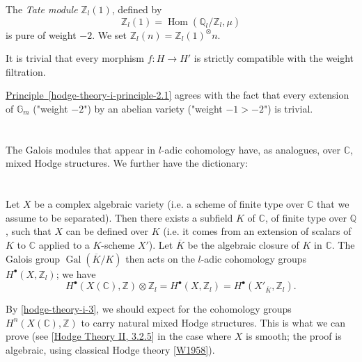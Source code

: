  The \emph{Tate module} \(\mathbb {Z}_l(1)\), defined by
  \[     \mathbb {Z}_l(1)     = \operatorname {Hom}(\mathbb {Q}_l/\mathbb {Z}_l,\mu )   \]
  is pure of weight \(-2\).
  We set \(\mathbb {Z}_l(n)=\mathbb {Z}_l(1)^\otimes  n\).\par{}It is trivial that every morphism \(f\colon  H\to  H'\) is strictly compatible with the weight filtration.\par{}\hyperref[hodge-theory-i-principle-2.1]{Principle~\ref*{hodge-theory-i-principle-2.1}} agrees with the fact that every extension of \(\mathbb {G}_m\) ("weight \(-2\)") by an abelian variety ("weight \(-1>-2\)") is trivial.\chapter{}\thispagestyle{fancy}\label{hodge-theory-i-3}\begin{translation}{}\label{hodge-theory-i-3-translation}\skipsinglepar\par{}The Galois modules that appear in \(l\)-adic cohomology have, as analogues, over \(\mathbb {C}\), mixed Hodge structures.
    We further have the dictionary:\end{translation}\chapter{}\thispagestyle{fancy}\label{hodge-theory-i-4}\par{}Let \(X\) be a complex algebraic variety (i.e. a scheme of finite type over \(\mathbb {C}\) that we assume to be separated).
  Then there exists a subfield \(K\) of \(\mathbb {C}\), of finite type over \(\mathbb {Q}\), such that \(X\) can be defined over \(K\) (i.e. it comes from an extension of scalars of \(K\) to \(\mathbb {C}\) applied to a \(K\)-scheme \(X'\)).
  Let \(\overline {K}\) be the algebraic closure of \(K\) in \(\mathbb {C}\).
  The Galois group \(\operatorname {Gal}(\overline {K}/K)\) then acts on the \(l\)-adic cohomology groups \(H^\bullet (X,\mathbb {Z}_l)\);
  we have
  \[     H^\bullet (X(\mathbb {C}),\mathbb {Z})\otimes \mathbb {Z}_l     = H^\bullet (X,\mathbb {Z}_l)     = H^\bullet (X'_{\overline {K}},\mathbb {Z}_l).   \]\par{}By \cref{hodge-theory-i-3}, we should expect for the cohomology groups \(H^n(X(\mathbb {C}),\mathbb {Z})\) to carry natural mixed Hodge structures.
  This is what we can prove (see [\hyperref[hodge-theory-ii-3.2.5]{Hodge Theory II, 3.2.5}] in the case where \(X\) is smooth; the proof is algebraic, using classical Hodge theory \hyperref[W1958]{[W1958]}).
